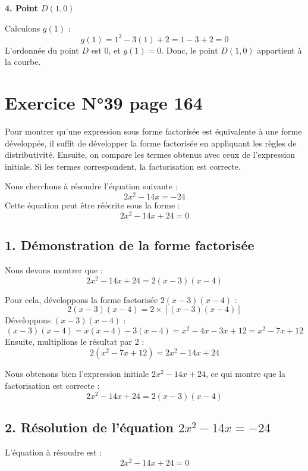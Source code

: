 \documentclass[a4paper,12pt]{article}
\begin{document}
  \textbf{4. Point \( D(1, 0) \)} \par

  Calculons \( g(1) \) :
  \[
  g(1) = 1^2 - 3(1) + 2 = 1 - 3 + 2 = 0
  \]
  L'ordonnée du point \( D \) est \( 0 \), et \( g(1) = 0 \). Donc, le point \( D(1, 0) \) appartient à la courbe.
  
  \section*{Exercice N°39 page 164}


  \begin{tcolorbox}[colback=yellow!10!white, colframe=yellow!50!black, title=Méthode pour vérifier une forme factorisée]
    Pour montrer qu'une expression sous forme factorisée est équivalente à une forme développée, il suffit de développer la forme factorisée en appliquant les règles de distributivité. Ensuite, on compare les termes obtenus avec ceux de l'expression initiale. Si les termes correspondent, la factorisation est correcte.
    \end{tcolorbox}
    
    Nous cherchons à résoudre l'équation suivante :
    \[
    2x^2 - 14x = -24
    \]
    Cette équation peut être réécrite sous la forme :
    \[
    2x^2 - 14x + 24 = 0
    \]
    
    \subsection*{1. Démonstration de la forme factorisée}
    Nous devons montrer que :
    \[
    2x^2 - 14x + 24 = 2(x - 3)(x - 4)
    \]
    
    Pour cela, développons la forme factorisée \( 2(x - 3)(x - 4) \) :
    \[
    2(x - 3)(x - 4) = 2 \times [(x - 3)(x - 4)]
    \]
    Développons \( (x - 3)(x - 4) \) :
    \[
    (x - 3)(x - 4) = x(x - 4) - 3(x - 4) = x^2 - 4x - 3x + 12 = x^2 - 7x + 12
    \]
    Ensuite, multiplions le résultat par 2 :
    \[
    2(x^2 - 7x + 12) = 2x^2 - 14x + 24
    \]
    
    Nous obtenons bien l'expression initiale \( 2x^2 - 14x + 24 \), ce qui montre que la factorisation est correcte :
    \[
    2x^2 - 14x + 24 = 2(x - 3)(x - 4)
    \]
    
    \subsection*{2. Résolution de l'équation \( 2x^2 - 14x = -24 \)}
    L'équation à résoudre est :
    \[
    2x^2 - 14x + 24 = 0
    \]
    
\end{document}
